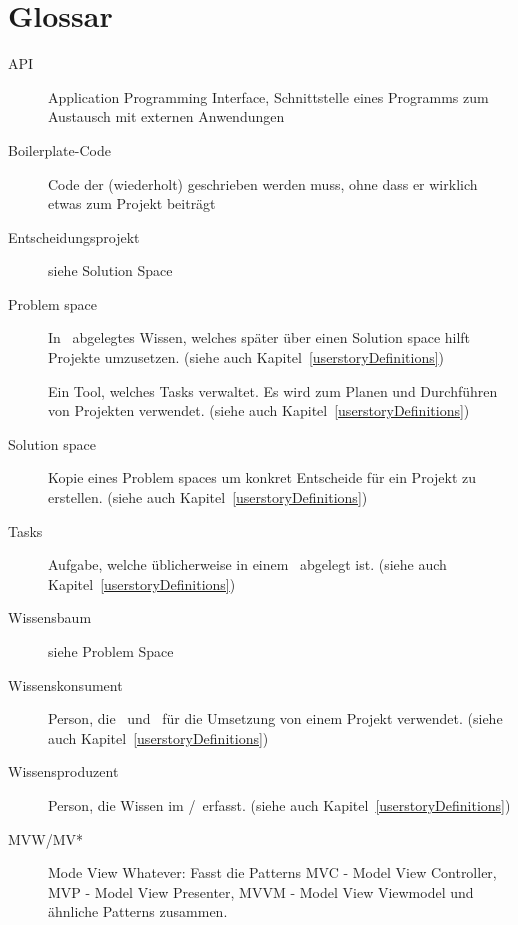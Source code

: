\chapter{Glossar}
	\begin{description}
		\item[API]{Application Programming Interface, Schnittstelle eines Programms zum Austausch mit externen Anwendungen}
		\item[Boilerplate-Code]{Code der (wiederholt) geschrieben werden muss, ohne dass er wirklich etwas zum Projekt beiträgt}
		\item[Entscheidungsprojekt]{siehe Solution Space}
		\item[Problem space]{In \cdar\ abgelegtes Wissen, welches später über einen Solution space hilft Projekte umzusetzen. (siehe auch Kapitel~\ref{userstoryDefinitions})}
		\item[\ppt]{Ein Tool, welches Tasks verwaltet. Es wird zum Planen und Durchführen von Projekten verwendet. (siehe auch Kapitel~\ref{userstoryDefinitions})}
		\item[Solution space]{Kopie eines Problem spaces um konkret Entscheide für ein Projekt zu erstellen. (siehe auch Kapitel~\ref{userstoryDefinitions})}
		\item[Tasks]{Aufgabe, welche üblicherweise in einem \ppt\ abgelegt ist. (siehe auch Kapitel~\ref{userstoryDefinitions})}
		\item[Wissensbaum]{siehe Problem Space}
		\item[Wissenskonsument]{Person, die \cdar\ und \eeppi\ für die Umsetzung von einem Projekt verwendet. (siehe auch Kapitel~\ref{userstoryDefinitions})}
		\item[Wissensproduzent]{Person, die Wissen im \cdar/\eeppi\ erfasst. (siehe auch Kapitel~\ref{userstoryDefinitions})}
		\item[MVW/MV*] Mode View Whatever: Fasst die Patterns MVC - Model View Controller, MVP - Model View Presenter, MVVM - Model View Viewmodel und ähnliche Patterns zusammen.
	\end{description}
